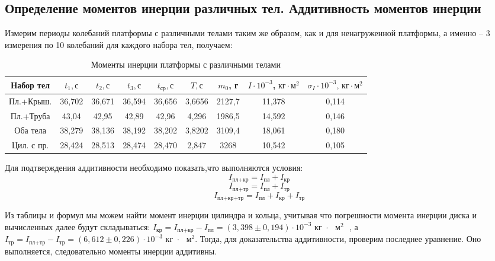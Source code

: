 \documentclass[a4paper,12pt]{article}
\begin{document}
\subsection*{Определение моментов инерции различных тел. Аддитивность моментов инерции}
    Измерим периоды колебаний платформы с различными телами таким же образом, как и для ненагруженной платформы, а именно -- 3 измерения по 10 колебаний для каждого набора тел, получаем:
	\begin{table}[H]
        \begin{center}
            \begin{tabular}{|c|c|c|c|c|c|c|c|c|}
                \hline 
                Набор тел & $t_1, с$ & $t_2, с$ & $t_3, с$ & $t_\text{ср}, с$ & $T, с$ & $m_0$, г & $I \cdot 10^{-3}$,$\text{ кг} \cdot \text{м}^2$ & $\sigma_I \cdot 10^{-3}\text{, кг} \cdot \text{м}^2$\\
                \hline
                Пл.+Крыш. & 36,702 & 36,671 & 36,594 &  36,656  & 3,6656 & 2127,7 & 11,378 & 0,114\\
                \hline 
                Пл.+Труба & 43,04 & 42,95 & 42,89 & 42,96 & 4,296 & 1986,5 & 14,592 & 0,146\\
                \hline 
                Оба тела & 38,279 & 38,136 & 38,192 & 38,202 & 3,8202 & 3109,4 & 18,061 & 0,180\\
                \hline 
                Цил. с пр. & 28,424 & 28,513 & 28,474 & 28,470 & 2,847 & 3268 & 10,542 & 0,105\\
                \hline
            \end{tabular}
            \caption{Моменты инерции платформы с различными телами}
        \end{center}
    \end{table} 

    Для подтверждения аддитивности необходимо показать,что выполняются условия:
    $$I_\text{пл+кр} = I_\text{пл} + I_\text{кр}$$
    $$I_\text{пл+тр} = I_\text{пл} + I_\text{тр}$$
    $$I_\text{пл+кр+тр} = I_\text{пл} + I_\text{кр} + I_\text{тр}$$

    Из таблицы и формул мы можем найти момент инерции цилиндра и кольца, учитывая что погрешности момента инерции диска и вычисленных далее будут складываться: $I_\text{кр} = I_\text{пл+кр} - I_\text{пл} = \left(3,398 \pm 0,194\right) \cdot 10^{-3} \text{ кг $\cdot$ $\text{м}^2$ }$, а $I_\text{тр} = I_\text{пл+тр} - I_\text{тр} = \left(6,612 \pm 0,226\right) \cdot 10^{-3} \text{ кг $\cdot$ $\text{м}^2$}$.
    Тогда, для доказательства аддитивности, проверим последнее уравнение. Оно выполняется, следовательно моменты инерции аддитивны.
    
\end{document}
